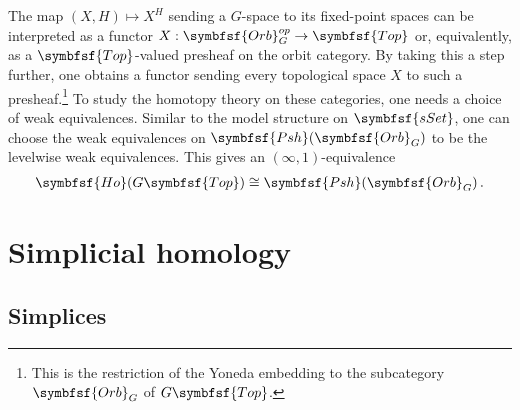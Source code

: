     \begin{theorem}[Elmendorf]
        The map $(X,H)\mapsto X^H$ sending a $G$-space to its fixed-point spaces can be interpreted as a functor $X:\symbfsf{Orb}_G^{op}\rightarrow\symbfsf{Top}$ or, equivalently, as a $\symbfsf{Top}$-valued presheaf on the orbit category. By taking this a step further, one obtains a functor sending every topological space $X$ to such a presheaf.\footnote{This is the restriction of the Yoneda embedding to the subcategory $\symbfsf{Orb}_G$ of $G\symbfsf{Top}$.} To study the homotopy theory on these categories, one needs a choice of weak equivalences. Similar to the model structure on $\symbfsf{sSet}$, one can choose the weak equivalences on $\symbfsf{Psh}(\symbfsf{Orb}_G)$ to be the levelwise weak equivalences. This gives an $(\infty,1)$-equivalence
        \begin{gather}
            \symbfsf{Ho}(G\symbfsf{Top})\cong\symbfsf{Psh}(\symbfsf{Orb}_G)\,.
        \end{gather}
    \end{theorem}


\section{Simplicial homology}\label{section:homology}
\subsection{Simplices}

